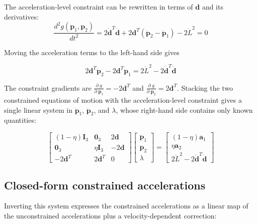 \documentclass[]{article}
\newcommand{\pd}[2]{\frac{\partial\;#1}{\partial\;#2}}
\begin{document}
The acceleration-level constraint can be rewritten in terms of $\mathbf{d}$ and its derivatives:
\begin{equation}
    \frac{d^2 g(\mathbf{p}_1, \mathbf{p}_2)}{dt^2} = 2 \dot{\mathbf{d}}^T \dot{\mathbf{d}} + 2 \mathbf{d}^T (\ddot{\mathbf{p}}_2 - \ddot{\mathbf{p}}_1) - 2 \dot{L}^2 = 0
\end{equation}

Moving the acceleration terms to the left-hand side gives

\begin{equation}
    2 \mathbf{d}^T \ddot{\mathbf{p}}_2 - 2 \mathbf{d}^T \ddot{\mathbf{p}}_1 = 2 \dot{L}^2 - 2 \dot{\mathbf{d}}^T \dot{\mathbf{d}}
\end{equation}

The constraint gradients are $\pd{g}{\mathbf{p}_1} = -2 \mathbf{d}^T$ and $\pd{g}{\mathbf{p}_2} = 2 \mathbf{d}^T$.  Stacking the two constrained equations of motion with the acceleration-level constraint gives a single linear system in $\ddot{\mathbf{p}}_1$, $\ddot{\mathbf{p}}_2$, and $\lambda$, whose right-hand side contains only known quantities:

\begin{equation}
    \begin{bmatrix}
        (1-\eta) \mathbf{I}_3 & \mathbf{0}_3 & 2\mathbf{d} \\
        \mathbf{0}_3 & \eta \mathbf{I}_3 & -2\mathbf{d} \\
        -2\mathbf{d}^T & 2\mathbf{d}^T & 0
    \end{bmatrix} \begin{bmatrix}
        \ddot{\mathbf{p}}_1 \\
        \ddot{\mathbf{p}}_2 \\
        \lambda
    \end{bmatrix} = \begin{bmatrix}
        (1-\eta) \mathbf{a}_1 \\
        \eta \mathbf{a}_2 \\
        2 \dot{L}^2 - 2 \dot{\mathbf{d}}^T \dot{\mathbf{d}}
    \end{bmatrix}
\end{equation}

\subsection{Closed-form constrained accelerations}

Inverting this system expresses the constrained accelerations as a linear map of the unconstrained accelerations plus a velocity-dependent correction:
\end{document}
